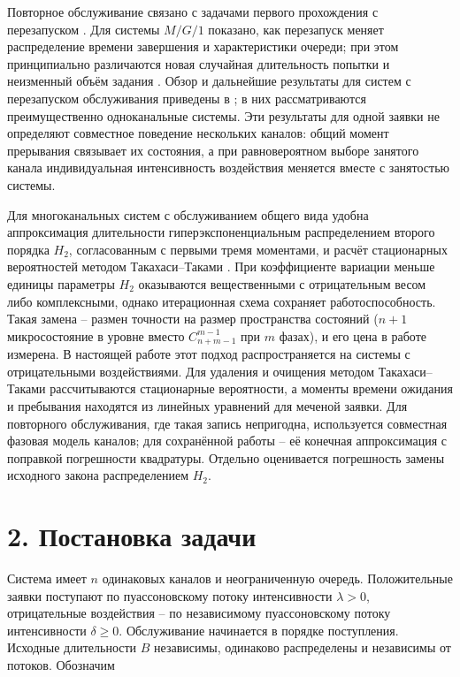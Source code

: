 Повторное обслуживание связано с задачами первого прохождения с перезапуском \cite{pal2017}. Для системы \(M/G/1\) показано, как перезапуск меняет распределение времени завершения и характеристики очереди; при этом принципиально различаются новая случайная длительность попытки и неизменный объём задания \cite{bonomo2022}. Обзор и дальнейшие результаты для систем с перезапуском обслуживания приведены в \cite{roy2024,bonomo2025}; в них рассматриваются преимущественно одноканальные системы. Эти результаты для одной заявки не определяют совместное поведение нескольких каналов: общий момент прерывания связывает их состояния, а при равновероятном выборе занятого канала индивидуальная интенсивность воздействия меняется вместе с занятостью системы.

Для многоканальных систем с обслуживанием общего вида удобна аппроксимация длительности гиперэкспоненциальным распределением второго порядка \(H_2\), согласованным с первыми тремя моментами, и расчёт стационарных вероятностей методом Такахаси--Таками \cite{takahashi1976,ryzhikov2018ru}. При коэффициенте вариации меньше единицы параметры \(H_2\) оказываются вещественными с отрицательным весом либо комплексными, однако итерационная схема сохраняет работоспособность. Такая замена -- размен точности на размер пространства состояний (\(n+1\) микросостояние в уровне вместо \(C_{n+m-1}^{m-1}\) при \(m\) фазах), и его цена в работе измерена. В настоящей работе этот подход распространяется на системы с отрицательными воздействиями. Для удаления и очищения методом Такахаси--Таками рассчитываются стационарные вероятности, а моменты времени ожидания и пребывания находятся из линейных уравнений для меченой заявки. Для повторного обслуживания, где такая запись непригодна, используется совместная фазовая модель каналов; для сохранённой работы -- её конечная аппроксимация с поправкой погрешности квадратуры. Отдельно оценивается погрешность замены исходного закона распределением \(H_2\).

\section*{2. Постановка задачи}
Система имеет \(n\) одинаковых каналов и неограниченную очередь. Положительные заявки поступают по пуассоновскому потоку интенсивности \(\lambda>0\), отрицательные воздействия -- по независимому пуассоновскому потоку интенсивности \(\delta\ge0\). Обслуживание начинается в порядке поступления. Исходные длительности \(B\) независимы, одинаково распределены и независимы от потоков. Обозначим


